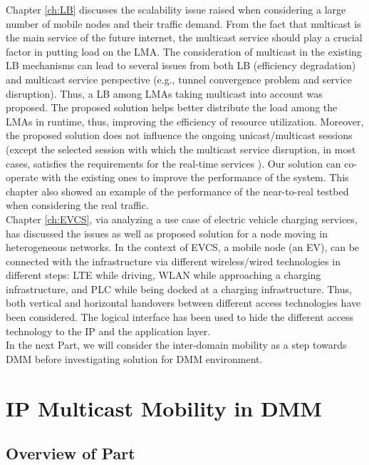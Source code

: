 \documentclass[a4paper,10pt,twoside]{ThesisStyle}
\begin{document}
Chapter \ref{ch:LB} discusses the scalability issue raised when considering a large number of mobile nodes and their traffic demand. From the fact that multicast is the main service of the future internet, the multicast service should play a crucial factor in putting load on the LMA. The consideration of multicast in the existing LB mechanisms can lead to several issues from both LB (efficiency degradation) and multicast service perspective (e.g., tunnel convergence problem and service disruption).  Thus, a LB among LMAs taking multicast into account was proposed. The proposed solution helps better distribute the load among the LMAs in runtime, thus, improving the efficiency of resource utilization. Moreover, the proposed solution does not influence the ongoing unicast/multicast sessions (except the selected session with which the multicast service disruption, in most cases, satisfies the requirements for the real-time services \cite{interruption_requirements}). Our solution can co-operate with the existing ones to improve the performance of the system. This chapter also showed an example of the performance of the near-to-real testbed when considering the real traffic.\\ 

Chapter \ref{ch:EVCS}, via analyzing a use case of electric vehicle charging services, has discussed the issues as well as proposed solution for a node moving in heterogeneous networks. In the context of EVCS, a mobile node (an EV), can be connected with the infrastructure via different wireless/wired technologies in different steps: LTE while driving, WLAN while approaching a charging infrastructure, and PLC while being docked at a charging infrastructure. Thus, both vertical and horizontal handovers between different access technologies have been considered. The logical interface has been used to hide the different access technology to the IP and the application layer. \\
 
In the next Part, we will consider the inter-domain mobility as a step towards DMM before investigating solution for DMM environment.

\part{IP Multicast Mobility in DMM}
\label{pa:part3}
\chapter*{Overview of Part \ref{pa:part3}}
\end{document}

